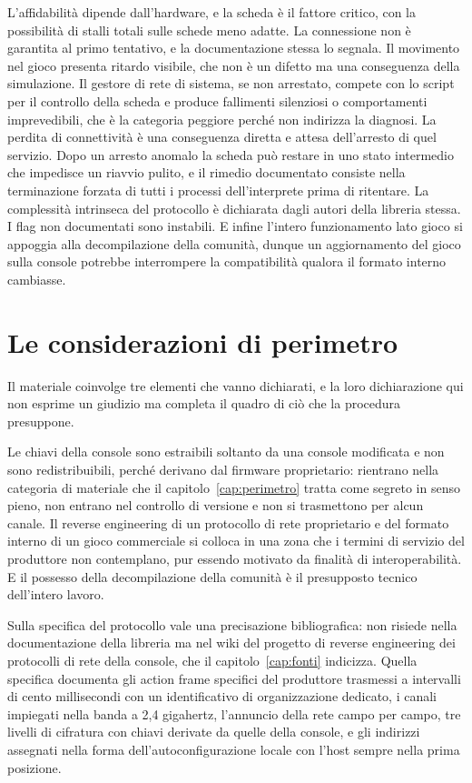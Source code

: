 L'affidabilità dipende dall'hardware, e la scheda è il fattore critico, con la possibilità di stalli totali sulle schede meno adatte. La connessione non è garantita al primo tentativo, e la documentazione stessa lo segnala. Il movimento nel gioco presenta ritardo visibile, che non è un difetto ma una conseguenza della simulazione. Il gestore di rete di sistema, se non arrestato, compete con lo script per il controllo della scheda e produce fallimenti silenziosi o comportamenti imprevedibili, che è la categoria peggiore perché non indirizza la diagnosi. La perdita di connettività è una conseguenza diretta e attesa dell'arresto di quel servizio. Dopo un arresto anomalo la scheda può restare in uno stato intermedio che impedisce un riavvio pulito, e il rimedio documentato consiste nella terminazione forzata di tutti i processi dell'interprete prima di ritentare. La complessità intrinseca del protocollo è dichiarata dagli autori della libreria stessa. I flag non documentati sono instabili. E infine l'intero funzionamento lato gioco si appoggia alla decompilazione della comunità, dunque un aggiornamento del gioco sulla console potrebbe interrompere la compatibilità qualora il formato interno cambiasse.

\section{Le considerazioni di perimetro}

Il materiale coinvolge tre elementi che vanno dichiarati, e la loro dichiarazione qui non esprime un giudizio ma completa il quadro di ciò che la procedura presuppone.

Le chiavi della console sono estraibili soltanto da una console modificata e non sono redistribuibili, perché derivano dal firmware proprietario: rientrano nella categoria di materiale che il capitolo~\ref{cap:perimetro} tratta come segreto in senso pieno, non entrano nel controllo di versione e non si trasmettono per alcun canale. Il reverse engineering di un protocollo di rete proprietario e del formato interno di un gioco commerciale si colloca in una zona che i termini di servizio del produttore non contemplano, pur essendo motivato da finalità di interoperabilità. E il possesso della decompilazione della comunità è il presupposto tecnico dell'intero lavoro.

Sulla specifica del protocollo vale una precisazione bibliografica: non risiede nella documentazione della libreria ma nel wiki del progetto di reverse engineering dei protocolli di rete della console, che il capitolo~\ref{cap:fonti} indicizza. Quella specifica documenta gli action frame specifici del produttore trasmessi a intervalli di cento millisecondi con un identificativo di organizzazione dedicato, i canali impiegati nella banda a 2,4 gigahertz, l'annuncio della rete campo per campo, tre livelli di cifratura con chiavi derivate da quelle della console, e gli indirizzi assegnati nella forma dell'autoconfigurazione locale con l'host sempre nella prima posizione.

